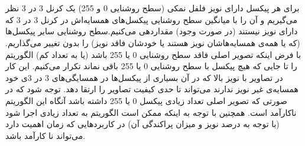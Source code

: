 \documentclass{article}
\begin{document}
\subsection{}
\begin{latin}

\end{latin}



\section{}%
\subsection{}
برای هر پیکسل دارای نویز فلفل نمکی (سطح روشنایی 0 و 255) یک کرنل 3 در 3 نظر می‌گیریم و آن را با میانگین سطح روشنایی پیکسل‌های همسایه‌اش در کرنل 3 در 3 که دارای نویز نیستند (در صورت وجود) مقداردهی می‌کنیم.سطح روشنایی سایر پیکسل‌ها (که یا همه‌ی همسایه‌هاشان نویز هستند یا خودشان فاقد نویز) را بدون تغییر می‌گذاریم. با فرض اینکه تصویر اصلی فاقد سطح روشنایی 0 یا 255 باشد (یا به تعداد کم) الگوریتم را تا جایی که هیچ پیکسل با سطح روشنایی 0 یا 255 باقی نماند تکرار می‌کنیم. این کار در تصاویر با نویز بالا که در آن بسیاری از پیکسل‌ها در همسایگی‌های 3 در 3ی خود همسایه‌ی غیر نویز ندارند می‌تواند تا حدی کیفیت تصاویر را ارتقا دهد. توجه شود که در صورتی که تصویر اصلی تعداد زیادی پیکسل 0 یا 255 داشته باشد آنگاه این الگوریتم ناکارآمد است. همچنین با توجه به اینکه ممکن است الگوریتم به تعداد زیادی اجرا شود (با توجه به درصد نویز و میزان پراکندگی آن) در کاربردهایی که زمان اهمیت دارد می‌تواند نا کارآمد باشد.
\subsection{}
\begin{latin}

\end{latin}

\subsection{}
\begin{latin}

\end{latin}

\subsection{}
\end{document}
